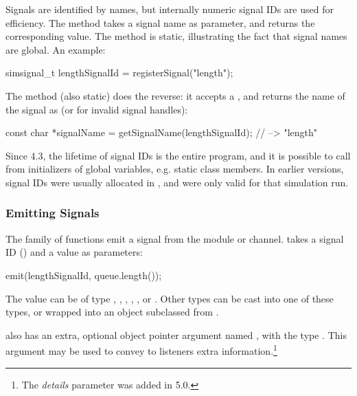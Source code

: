 \begin{ned}
Signals are identified by names, but internally numeric signal IDs are used
for efficiency. The  method takes a signal name as
parameter, and returns the corresponding  value.
The method is static, illustrating the fact that signal names are global.
An example:

\begin{cpp}
simsignal_t lengthSignalId = registerSignal("length");
\end{cpp}

The  method (also static) does the reverse:
it accepts a , and returns the name of the signal as
 (or  for invalid signal handles):

\begin{cpp}
const char *signalName = getSignalName(lengthSignalId); // --> "length"
\end{cpp}

\begin{note}
  Since {\opp} 4.3, the lifetime of signal IDs is the entire program, and
  it is possible to call  from initializers of
  global variables, e.g. static class members. In earlier versions,
  signal IDs were usually allocated in , and were
  only valid for that simulation run.
\end{note}

\subsubsection{Emitting Signals}
\label{sec:simple-modules:emitting-signals}

The  family of functions emit a signal from the module or
channel.  takes a signal ID () and
a value as parameters:

\begin{cpp}
emit(lengthSignalId, queue.length());
\end{cpp}

The value can be of type , , , ,
, or . Other types can be cast into
one of these types, or wrapped into an object subclassed from .

 also has an extra, optional object pointer argument named
, with the type . This argument may be used
to convey to listeners extra information.\footnote{The \textit{details}
parameter was added in {\opp} 5.0.}


\end{ned}
